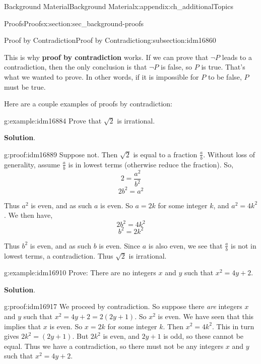 \documentclass[oneside,10pt,]{book}
\newcommand{\terminology}[1]{\textbf{#1}}
\numberwithin{equation}{chapter}
\begin{document}
\begin{appendixptx}{Background Material}{}{Background Material}{}{}{x:appendix:ch_additionalTopics}
\begin{sectionptx}{Proofs}{}{Proofs}{}{}{x:section:sec_background-proofs}
\begin{subsectionptx}{Proof by Contradiction}{}{Proof by Contradiction}{}{}{g:subsection:idm16860}
\par
This is why \terminology{proof by contradiction} works. If we can prove that \(\neg P\) leads to a contradiction, then the only conclusion is that \(\neg P\) is false, so \(P\) is true. That's what we wanted to prove. In other words, if it is impossible for \(P\) to be false, \(P\) must be true.%
\par
Here are a couple examples of proofs by contradiction:%
\begin{example}{}{g:example:idm16884}%
Prove that \(\sqrt{2}\) is irrational.%
\par\smallskip%
\noindent\textbf{Solution}.\hypertarget{g:solution:idm16888}{}\quad{}\begin{proofptx}{}{g:proof:idm16889}
Suppose not. Then \(\sqrt 2\) is equal to a fraction \(\frac{a}{b}\). Without loss of generality, assume \(\frac{a}{b}\) is in lowest terms (otherwise reduce the fraction). So,%
\begin{equation*}
2 = \frac{a^2}{b^2}
\end{equation*}
%
\begin{equation*}
2b^2 = a^2
\end{equation*}
%
\par
Thus \(a^2\) is even, and as such \(a\) is even. So \(a = 2k\) for some integer \(k\), and \(a^2 = 4k^2\). We then have,%
\begin{equation*}
2b^2 = 4k^2
\end{equation*}
%
\begin{equation*}
b^2 = 2k^2
\end{equation*}
%
\par
Thus \(b^2\) is even, and as such \(b\) is even. Since \(a\) is also even, we see that \(\frac{a}{b}\) is not in lowest terms, a contradiction. Thus \(\sqrt 2\) is irrational.%
\end{proofptx}
\end{example}
\begin{example}{}{g:example:idm16910}%
Prove: There are no integers \(x\) and \(y\) such that \(x^2  = 4y + 2\).%
\par\smallskip%
\noindent\textbf{Solution}.\hypertarget{g:solution:idm16916}{}\quad{}\begin{proofptx}{}{g:proof:idm16917}
We proceed by contradiction. So suppose there \emph{are} integers \(x\) and \(y\) such that \(x^2 = 4y + 2 = 2(2y + 1)\). So \(x^2\) is even. We have seen that this implies that \(x\) is even. So \(x = 2k\) for some integer \(k\). Then \(x^2 = 4k^2\). This in turn gives \(2k^2 = (2y + 1)\). But \(2k^2\) is even, and \(2y + 1\) is odd, so these cannot be equal. Thus we have a contradiction, so there must not be any integers \(x\) and \(y\) such that \(x^2 = 4y + 2\).%

\end{proofptx}
\end{example}
\end{subsectionptx}
\end{sectionptx}
\end{appendixptx}
\end{document}
